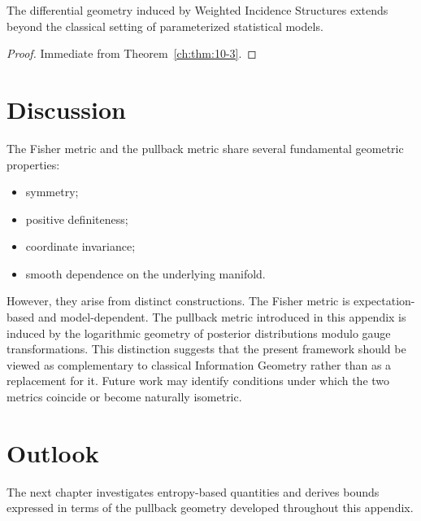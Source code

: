 \begin{corollary}[Generality]
\label{ch:cor:10-4}
The differential geometry induced by Weighted Incidence Structures
extends beyond the classical setting of parameterized statistical
models.
\end{corollary}
\begin{proof}
Immediate from Theorem~\ref{ch:thm:10-3}. 
\end{proof}
\section{Discussion}
The Fisher metric and the pullback metric share several fundamental
geometric properties:
\begin{itemize}
\item symmetry;
\item positive definiteness;
\item coordinate invariance;
\item smooth dependence on the underlying manifold.
\end{itemize}
However, they arise from distinct constructions.
The Fisher metric is expectation-based and model-dependent.
The pullback metric introduced in this appendix is induced by the
logarithmic geometry of posterior distributions modulo gauge
transformations.
This distinction suggests that the present framework should be viewed as
complementary to classical Information Geometry rather than as a
replacement for it.
Future work may identify conditions under which the two metrics coincide
or become naturally isometric.
\section{Outlook}
The next chapter investigates entropy-based quantities and derives
bounds expressed in terms of the pullback geometry developed throughout
this appendix.

